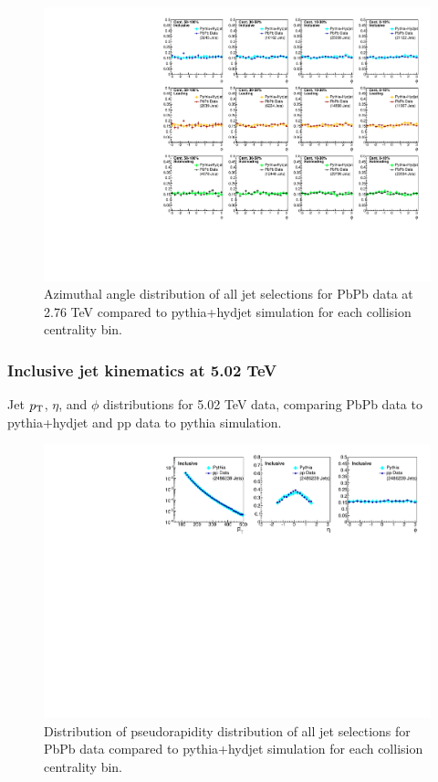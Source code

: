  
 \begin{figure}[h!]
 \begin{center}
 \includegraphics[width=1\textwidth]{figures/Appendices/JetPhi_MC_Data_HydJet_RecoJet_JetEtaCut16.pdf}
 \caption{Azimuthal angle distribution of all jet selections for PbPb data at 2.76 TeV compared to {\sc pythia+hydjet} simulation for each collision centrality bin.}
  \label{fig:PbPbJetPhi}
 \end{center}
 \end{figure}
 

 \clearpage
 
 
 
\subsubsection{Inclusive jet kinematics at 5.02 TeV}
\label{app:kinematics_run2}



Jet $p_{\rm T}$, $\eta$, and $\phi$ distributions for 5.02 TeV data, comparing PbPb data to {\sc pythia+hydjet} and pp data to {\sc pythia} simulation. 


 \begin{figure}[h!]
 \begin{center}

  \includegraphics[width=.75\textwidth]{figures/Appendices/JetKinematics_pp_Pythia.pdf}
 \caption{ Distribution of pseudorapidity distribution of all jet selections for PbPb data compared to {\sc pythia+hydjet} simulation for each collision centrality bin.}
\label{fig:ppJetPt2}
 \end{center}
 \end{figure}
 
